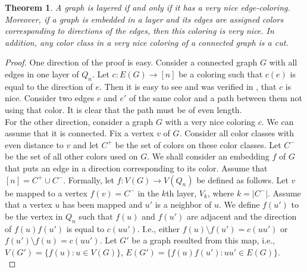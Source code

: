 \documentclass[11pt, a4paper]{article}
\newtheorem{theorem}{Theorem}
\begin{document}
	
\begin{theorem}\label{very-nice}
A graph is layered if and only if it has a very nice edge-coloring. Moreover, if a graph is embedded in a layer and its edges are assigned colors corresponding to directions of the edges, then this coloring is very nice. In addition, any color class in a very nice coloring of a connected graph is a cut.
\end{theorem}
	
	
	
	\begin{proof}
	One direction of the proof is easy. Consider a connected graph $G$ with all edges in one layer of $Q_n$. 
	Let $c: E(G)\rightarrow [n]$ be a coloring such that $c(e)$ is equal to the direction of $e$.
	Then it is easy to see and was verified in  \cite{HM}, that $c$ is nice. 
	Consider  two edges $e$ and $e'$ of the same color and  a path between them not using that color. It is clear that the path must be of even length. \\
	
	For the other direction, consider a graph $G$ with a very nice coloring $c$. We can assume that it is connected. 
	Fix a vertex $v$ of $G$. Consider all color classes with even distance to $v$ and let $C^+$ be the set of colors on these color classes.  Let $C^-$ be the set of all other colors used on $G$. 
	We shall consider an embedding $f$  of $G$ that puts an edge in a direction corresponding to its color.  Assume that  $[n]=C^+ \cup C^-$. 
	Formally, let $f: V(G) \rightarrow V(Q_n)$ be defined as follows.
	Let $v$ be mapped to a vertex $f(v)= C^-$ in the $k$th layer, $V_k$, where $k= |C^-|$. Assume that a vertex $u$ has been mapped and $u'$ is a neighbor of $u$. We define $f(u')$ 
	to be the vertex in $Q_n$ such that $f(u)$ and $f(u')$ are adjacent and  the direction of $f(u)f(u')$ is equal to $c(uu')$. I.e., either $f(u)\setminus f(u')= c(uu')$ or $f(u') \setminus f(u)= c(uu')$.
  Let $G'$ be a graph resulted from this map, i.e., $V(G') = \{f(u): u\in V(G)\}$, $E(G') = \{f(u)f(u'): uu' \in E(G)\}$.\\
	

\end{proof}
\end{document}
